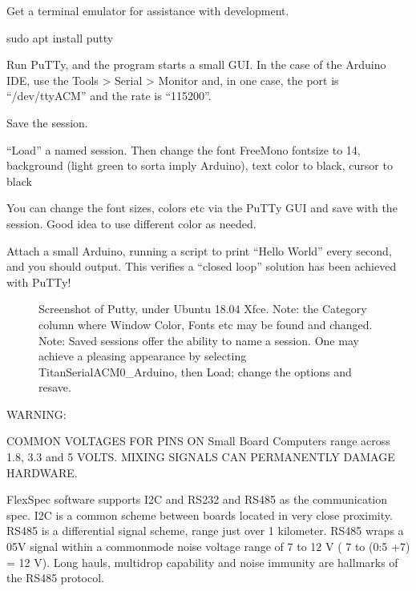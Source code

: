 \documentclass[letterpaper,10pt,english,openany,oneside]{sphinxmanual}
\begin{document}
\sphinxAtStartPar
Get a terminal emulator for assistance with development.

\begin{sphinxVerbatim}[commandchars=\\\{\}]
sudo apt install putty
\end{sphinxVerbatim}

\sphinxAtStartPar
Run PuTTy, and the program starts a small GUI. In the case
of the Arduino IDE, use the Tools \sphinxhyphen{}\textgreater{} Serial \sphinxhyphen{}\textgreater{} Monitor
and, in one case, the port is “/dev/ttyACM” and the rate
is “115200”.

\sphinxAtStartPar
Save the session.

\sphinxAtStartPar
“Load” a named session. Then change the font FreeMono font\sphinxhyphen{}size to 14,
background (light green to sorta imply Arduino), text color to black,
cursor to black

\sphinxAtStartPar
You can change the font sizes, colors etc
via the PuTTy GUI and save with the session. Good idea to
use different color as needed.

\sphinxAtStartPar
Attach a small Arduino, running a script to print “Hello World”
every second, and you should output. This verifies a “closed
loop” solution has been achieved with PuTTy!


\begin{wrapfigure}{l}{0pt}
\centering
\noindent{}
\caption{Screenshot of Putty, under Ubuntu 18.04 Xfce. Note: the Category column \textendash{} where Window Color, Fonts etc may be found and changed. Note: Saved sessions offer the ability to name a session. One may achieve a pleasing appearance by selecting TitanSerialACM0\_Arduino, then Load; change the options and resave.}\label{\detokenize{serial:id2}}\end{wrapfigure}

\sphinxAtStartPar
WARNING:

\sphinxAtStartPar
COMMON VOLTAGES FOR PINS ON Small Board Computers range across
1.8, 3.3 and 5 VOLTS. MIXING SIGNALS CAN PERMANENTLY DAMAGE
HARDWARE.

\sphinxAtStartPar
FlexSpec software supports I2C and RS\sphinxhyphen{}232 and RS\sphinxhyphen{}485 as the communication
spec. I2C is a common scheme between boards located in very close
proximity. RS\sphinxhyphen{}485 is a differential signal scheme, range just over 1
kilometer. RS\sphinxhyphen{}485 wraps a 0\sphinxhyphen{}5V signal within a common\sphinxhyphen{}mode noise
voltage range of \sphinxhyphen{}7 to 12 V ( \sphinxhyphen{}7 to (0:5 +7) = 12 V). Long hauls,
multidrop capability and noise immunity are hallmarks of the RS\sphinxhyphen{}485
protocol.
\end{document}
